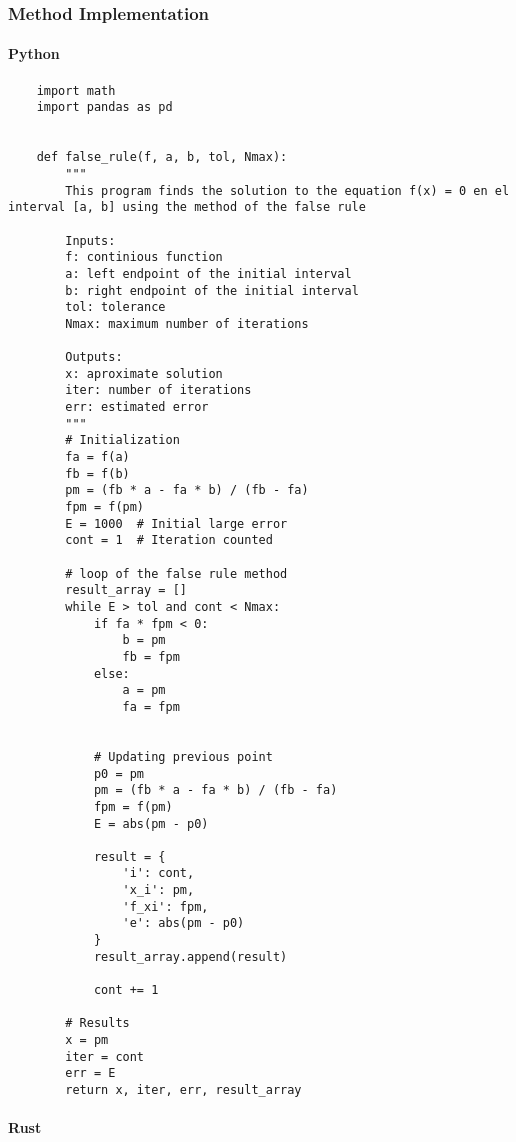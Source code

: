 \documentclass{article}
\begin{document}
        \subsubsection{Method Implementation}
        \paragraph{Python}
        \begin{verbatim}
    import math
    import pandas as pd


    def false_rule(f, a, b, tol, Nmax):
        """
        This program finds the solution to the equation f(x) = 0 en el interval [a, b] using the method of the false rule

        Inputs:
        f: continious function
        a: left endpoint of the initial interval
        b: right endpoint of the initial interval
        tol: tolerance
        Nmax: maximum number of iterations

        Outputs:
        x: aproximate solution
        iter: number of iterations
        err: estimated error
        """
        # Initialization
        fa = f(a)
        fb = f(b)
        pm = (fb * a - fa * b) / (fb - fa)
        fpm = f(pm)
        E = 1000  # Initial large error
        cont = 1  # Iteration counted

        # loop of the false rule method
        result_array = []
        while E > tol and cont < Nmax:
            if fa * fpm < 0:
                b = pm
                fb = fpm
            else:
                a = pm
                fa = fpm


            # Updating previous point
            p0 = pm
            pm = (fb * a - fa * b) / (fb - fa)
            fpm = f(pm)
            E = abs(pm - p0)

            result = {
                'i': cont,
                'x_i': pm,
                'f_xi': fpm,
                'e': abs(pm - p0)
            }
            result_array.append(result)

            cont += 1

        # Results
        x = pm
        iter = cont
        err = E
        return x, iter, err, result_array
        \end{verbatim}

    \paragraph{Rust}
\end{document}
